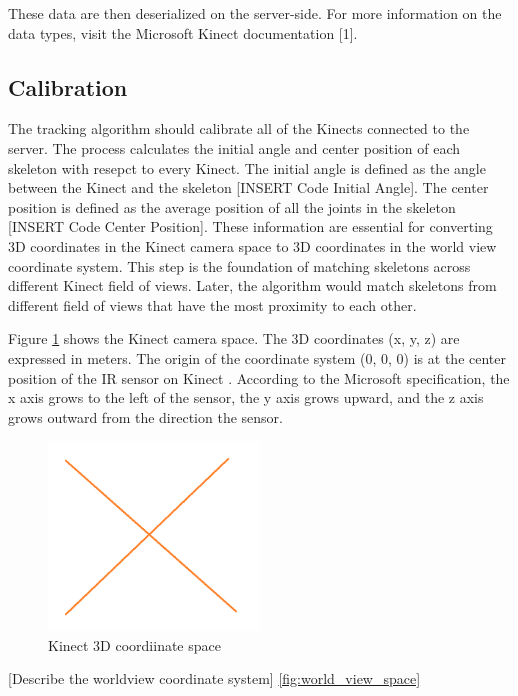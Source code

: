 \documentclass[paper=a4, fontsize=11pt]{scrartcl}
\numberwithin{equation}{section}		%
\numberwithin{figure}{section}			%
\numberwithin{table}{section}				%
\begin{document}
These data are then deserialized on the server-side. For more information on the data types, visit the Microsoft Kinect documentation [1].

\subsection{Calibration}

The tracking algorithm should calibrate all of the Kinects connected to the server. The process calculates the initial angle and center position of each skeleton with resepct to every Kinect. The initial angle is defined as the angle between the Kinect and the skeleton [INSERT Code Initial Angle]. The center position is defined as the average position of all the joints in the skeleton [INSERT Code Center Position]. These information are essential for converting 3D coordinates in the Kinect camera space to 3D coordinates in the world view coordinate system. This step is the foundation of matching skeletons across different Kinect field of views. Later, the algorithm would match skeletons from different field of views that have the most proximity to each other.

Figure \ref{fig:kinect_camera_space} shows the Kinect camera space. The 3D coordinates (x, y, z) are expressed in meters. The origin of the coordinate system (0, 0, 0) is at the center position of the IR sensor on Kinect \cite{kinect_coordinate_space}. According to the Microsoft specification, the x axis grows to the left of the sensor, the y axis grows upward, and the z axis grows outward from the direction the sensor.

\begin{figure}[H]
	\centering
	\includegraphics[width=0.5\textwidth]{na}
	\caption{Kinect 3D coordiinate space}
	\label{fig:kinect_camera_space}
\end{figure}

[Describe the worldview coordinate system] \ref{fig:world_view_space}
\end{document}
